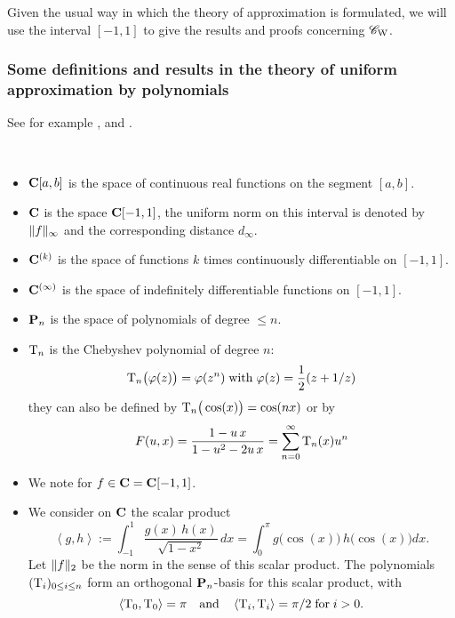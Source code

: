 \medskip{} Given the usual way in which the theory of approximation is formulated, we will use the interval $[-1,1]$ to give the results and proofs concerning ${{{\mathscr C}}_{\rm W}}$.


\subsubsection{Some definitions and results in the theory of uniform approximation by polynomials}\label{subsubsec521}

See for example \cite{Ba}, \cite{Ri} and \cite{Ch}. 

\begin{notation} \label{521}~ 
\begin{itemize}\itemsep2pt

\item [] 
${{\bf C}[a,b]}$ is the space of continuous real functions on the segment $[a,b]$.

\item [] 
${\bf C}$ is the space ${{\bf C}[-1,1]}$, the uniform norm on this interval is denoted by $\lVert f \rVert_{\infty}$ and the corresponding distance $d_{\infty}$. 

\item []
 ${\bf C}^{(k)}$ is the space of functions $k$ times continuously differentiable on $[-1,1]$. 

\item [] 
${\bf C}^{(\infty)}$ is the space of indefinitely differentiable functions on $[-1,1]$. 

\item [] 
${\bf P}_n$ is the space of polynomials of degree $\leq n$. 

\item [] 
${\rm T}_n$ is the Chebyshev polynomial of degree $n$: 
\[
{\rm T}_n\big(\varphi (z)\big)= \varphi(z^n) \; {\rm with } \; \varphi(z) = \frac {1} {2} (z + 1/z)
\]
they can also be defined by ${\rm T}_n\big(\cos (x)\big) = \cos (nx)$ or by 
\[
F(u,x) = \frac {1-u\,x} {1-u^2-2u\,x} = \sum_{n=0}^{\infty} {\rm T}_n(x)u^n
\]
\item []
We note  for $f \in {\bf C}={{\bf C}[-1,1]}$. 

\item [] 
We consider on ${\bf C}$ the scalar product 
\[
\left < g,h \right > := \int_{-1}^1 \frac {g(x)\,h(x)} {\sqrt {1-x^2}}\, dx 
= \int_0^{\pi} g\big(\cos (x)\big)\,h \big(\cos (x)\big)dx. 
\]
Let $\lVert f \rVert_2$ be the norm in the sense of this scalar product. 
The polynomials $({\rm T}_i)_{0 \leq i \leq n}$ form an orthogonal ${\bf P}_n$-basis for this scalar product, with 
\[
\left < {\rm T}_0,{\rm T}_0 \right > = \pi \quad  {\rm and}  \quad  \left < {\rm T}_i,{\rm T}_i \right > = 
\pi /2 \; {\rm for } \; i>0.
\]


\end{itemize}
\end{notation}
